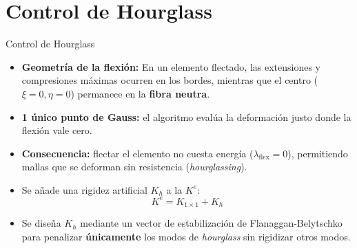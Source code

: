 \documentclass[10pt, aspectratio=43]{beamer}
\begin{document}
\section[Hourglass]{Control de Hourglass}
\begin{frame}{Control de Hourglass}
  \begin{uicard}[title=Origen del problema, top=2pt, bottom=3pt, left=6pt, right=6pt, attach title to upper={\par\vspace{0.05cm}}]
    \small
\begin{itemize}
      \item \textbf{Geometría de la flexión:} En un elemento flectado, las extensiones y compresiones máximas ocurren en los bordes, mientras que el centro ($\xi=0, \eta=0$) permanece en la \textbf{fibra neutra}.
      \item \textbf{1 único punto de Gauss:} el algoritmo evalúa la deformación justo donde la flexión vale cero.
      \item \textbf{Consecuencia:} flectar el elemento no cuesta energía ($\lambda_{\text{flex}} = 0$), permitiendo mallas que se deforman sin resistencia (\emph{hourglassing}).
    \end{itemize}
  \end{uicard}

  \vspace{0.01cm}

  \begin{uicard}[title=Estrategia de estabilización, top=2pt, bottom=3pt, left=6pt, right=6pt, attach title to upper={\par\vspace{0.05cm}}]
    \small
    \begin{itemize}
      \item Se añade una rigidez artificial $K_h$ a la $K^e$:
        $$K^e = K_{1\times 1} + K_h$$
      \item Se diseña $K_h$ mediante un vector de estabilización de Flanaggan-Belytschko para penalizar \textbf{únicamente} los modos de \emph{hourglass} sin rigidizar otros modos.
    \end{itemize}
  \end{uicard}
\end{frame}

\end{document}
